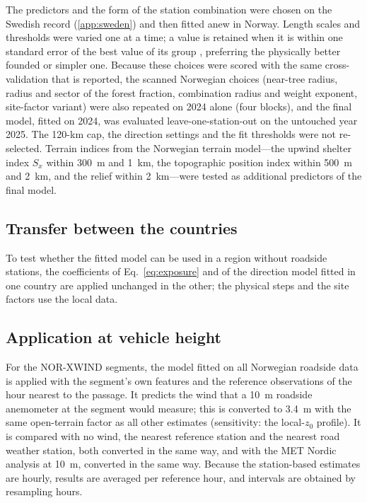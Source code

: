The predictors and the form of the station combination were chosen on the Swedish record (\ref{app:sweden}) and then fitted anew in Norway. Length scales and thresholds were varied one at a time; a value is retained when it is within one standard error of the best value of its group \citep{Hastie2009}, preferring the physically better founded or simpler one. Because these choices were scored with the same cross-validation that is reported, the scanned Norwegian choices (near-tree radius, radius and sector of the forest fraction, combination radius and weight exponent, site-factor variant) were also repeated on 2024 alone (four blocks), and the final model, fitted on 2024, was evaluated leave-one-station-out on the untouched year 2025. The 120-km cap, the direction settings and the fit thresholds were not re-selected. Terrain indices from the Norwegian terrain model---the upwind shelter index $S_x$ \citep{Winstral2002} within \SI{300}{m} and \SI{1}{km}, the topographic position index within \SI{500}{m} and \SI{2}{km}, and the relief within \SI{2}{km}---were tested as additional predictors of the final model.

\subsection{Transfer between the countries}
To test whether the fitted model can be used in a region without roadside stations, the coefficients of Eq.~\eqref{eq:exposure} and of the direction model fitted in one country are applied unchanged in the other; the physical steps and the site factors use the local data.

\subsection{Application at vehicle height}
For the NOR-XWIND segments, the model fitted on all Norwegian roadside data is applied with the segment's own features and the reference observations of the hour nearest to the passage. It predicts the wind that a \SI{10}{m} roadside anemometer at the segment would measure; this is converted to \SI{3.4}{m} with the same open-terrain factor as all other estimates (sensitivity: the local-$z_0$ profile). It is compared with no wind, the nearest reference station and the nearest road weather station, both converted in the same way, and with the MET Nordic analysis at \SI{10}{m}, converted in the same way. Because the station-based estimates are hourly, results are averaged per reference hour, and intervals are obtained by resampling hours.

